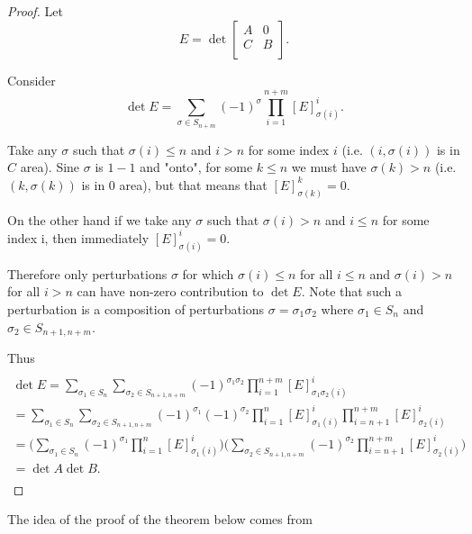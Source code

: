 \documentclass[main.tex]{subfiles}
\begin{document}
\begin{proof}
Let 
$$E = \det \begin{bmatrix}
    A &  0 \\
    C & B \\
\end{bmatrix}.$$

\noindent
Consider 
\begin{equation}
\det E = \sum\limits_{\sigma\in S_{n + m}} (-1)^\sigma \prod_{i=1}^{n+m} [E]^i_{\sigma(i)}.
\end{equation}

\noindent
Take any $\sigma$ such that $\sigma(i) \leq n$ and $i > n$ for some index $i$ (i.e. $(i, \sigma(i))$ is in $C$ area). Sine $\sigma$ is $1-1$ and "onto", for some $k \leq n$ we must have $\sigma(k) > n$ (i.e. $(k, \sigma(k))$ is in 0 area), but that means that $[E]^k_{\sigma(k)} = 0$. 

\noindent
On the other hand if we take any $\sigma$ such that $\sigma(i) > n$ and $i\leq n$ for some index i, then immediately $[E]^i_{\sigma(i)} = 0$.

\noindent
Therefore only perturbations $\sigma$ for which $\sigma(i) \leq n$ for all $i \leq n$ and $\sigma(i) > n$ for all $i > n$ can have non-zero contribution to $\det E$. Note that such a perturbation is a composition of perturbations $\sigma = \sigma_1\sigma_2$ where $\sigma_1\in S_n$ and $\sigma_2\in S_{n+1, n+m}$.

\noindent
Thus
\begin{multline*}\\
\det E = \sum\limits_{\sigma_1\in S_n} \sum\limits_{\sigma_2\in S_{n + 1, n + m}} (-1)^{\sigma_1\sigma_2} \prod\limits_{i=1}^{n+m} [E]^i_{\sigma_1\sigma_2(i)}
\\ = 
\sum\limits_{\sigma_1\in S_n} \sum\limits_{\sigma_2\in S_{n + 1, n + m}}
(-1)^{\sigma_1}(-1)^{\sigma_2} \prod_{i=1}^n [E]^i_{\sigma_1(i)} \prod_{i=n+1}^{n+m} [E]^i_{\sigma_2(i)}
\\ = \bigg(\sum\limits_{\sigma_1\in S_n} (-1)^{\sigma_1} \prod_{i=1}^n [E]^i_{\sigma_1(i)}\bigg)
\bigg(\sum\limits_{\sigma_2\in S_{n + 1, n + m}} (-1)^{\sigma_2}  \prod_{i=n+1}^{n+m} [E]^i_{\sigma_2(i)}\bigg)
\\ = \det A \det B. 
\\
\end{multline*}
\end{proof} 

The idea of the proof of the theorem below comes from \cite{devito}
\end{document}

